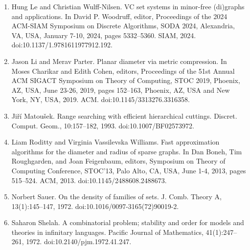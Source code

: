 \documentclass[10pt,a4paper]{article}
\begin{document}
\begin{enumerate}
\item[]  [16]  Hung Le and Christian Wulff-Nilsen.  VC set systems in minor-free (di)graphs and applications.  In David P. Woodruff, editor, Proceedings of the 2024 ACM-SIAM Symposium on Discrete Algorithms, SODA 2024, Alexandria, VA, USA, January 7-10, 2024, pages 5332–5360. SIAM, 2024.  doi:10.1137/1.9781611977912.192.  
\item[]  [17]  Jason Li and Merav Parter.  Planar diameter via metric compression.  In Moses Charikar and Edith Cohen, editors, Proceedings of the 51st Annual ACM SIGACT Symposium on Theory of Computing, STOC 2019, Phoenix, AZ, USA, June 23-26, 2019, pages 152–163, Phoenix, AZ, USA and New York, NY, USA, 2019. ACM.  doi:10.1145/3313276.3316358.  
\item[]  [18]  Jiří Matoušek.  Range searching with efficient hierarchical cuttings.  Discret. Comput. Geom., 10:157–182, 1993.  doi:10.1007/BF02573972.  
\item[]  [19]  Liam Roditty and Virginia Vassilevska Williams.  Fast approximation algorithms for the diameter and radius of sparse graphs.  In Dan Boneh, Tim Roughgarden, and Joan Feigenbaum, editors, Symposium on Theory of Computing Conference, STOC’13, Palo Alto, CA, USA, June 1-4, 2013, pages 515–524. ACM, 2013.  doi:10.1145/2488608.2488673.  
\item[]  [20]  Norbert Sauer.  On the density of families of sets.  J. Comb. Theory A, 13(1):145–147, 1972.  doi:10.1016/0097-3165(72)90019-2.  
\item[]  [21]  Saharon Shelah.  A combinatorial problem; stability and order for models and theories in infinitary languages.  Pacific Journal of Mathematics, 41(1):247–261, 1972.  doi:10.2140/pjm.1972.41.247.  
\end{enumerate}
\end{document}
